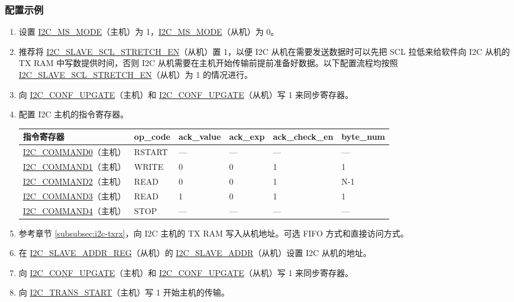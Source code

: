 \documentclass[main\_\_CN.tex]{subfiles}
\begin{document}
\subsubsection{配置示例}
\begin{enumerate}
\item 设置 \hyperref[fielddesc:I2CMSMODE]{I2C\_MS\_MODE}（主机）为 1，\hyperref[fielddesc:I2CMSMODE]{I2C\_MS\_MODE}（从机）为 0。
\item 推荐将 \hyperref[fielddesc:I2CSLAVESCLSTRETCHEN]{I2C\_SLAVE\_SCL\_STRETCH\_EN}（从机）置 1，以便 I2C 从机在需要发送数据时可以先把 SCL 拉低来给软件向 I2C 从机的 TX RAM 中写数提供时间，否则 I2C 从机需要在主机开始传输前提前准备好数据。以下配置流程均按照 \hyperref[fielddesc:I2CSLAVESCLSTRETCHEN]{I2C\_SLAVE\_SCL\_STRETCH\_EN}（从机）为 1 的情况进行。
\item 向 \hyperref[fielddesc:I2CCONFUPGATE]{I2C\_CONF\_UPGATE}（主机）和 \hyperref[fielddesc:I2CCONFUPGATE]{I2C\_CONF\_UPGATE}（从机）写 1 来同步寄存器。
\item 配置 I2C 主机的指令寄存器。
\clearpage
\begin{longtable}{ | p{4cm} | p{2cm} | p{2cm} | p{2cm} |p{2cm} | p{2cm} |}
\hline\rowcolor{lightgray}
指令寄存器& op\_code & ack\_value&ack\_exp&ack\_check\_en&byte\_num  \\ \hline
\hyperref[fielddesc:I2CCOMMAND0]{I2C\_COMMAND0}（主机）& RSTART& ---&---&---&---  \\ \hline
\hyperref[fielddesc:I2CCOMMAND1]{I2C\_COMMAND1}（主机）& WRITE& 0&0&1&1  \\ \hline
\hyperref[fielddesc:I2CCOMMAND2]{I2C\_COMMAND2}（主机）& READ& 0&0&1&N-1  \\ \hline
\hyperref[fielddesc:I2CCOMMAND3]{I2C\_COMMAND3}（主机）& READ& 1&0&1&1  \\ \hline
\hyperref[fielddesc:I2CCOMMAND4]{I2C\_COMMAND4}（主机）& STOP& ---&---&---&---  \\ \hline
\end{longtable}
\item 参考章节 \ref{subsubsec:i2c-txrx}，向 I2C 主机的 TX RAM 写入从机地址。可选 FIFO 方式和直接访问方式。
\item 在 \hyperref[regdesc:I2CSLAVEADDRREG]{I2C\_SLAVE\_ADDR\_REG}（从机）的 \hyperref[fielddesc:I2CSLAVEADDR]{I2C\_SLAVE\_ADDR}（从机）设置 I2C 从机的地址。
\item 向 \hyperref[fielddesc:I2CCONFUPGATE]{I2C\_CONF\_UPGATE}（主机）和 \hyperref[fielddesc:I2CCONFUPGATE]{I2C\_CONF\_UPGATE}（从机）写 1 来同步寄存器。
\item 向 \hyperref[fielddesc:I2CTRANSSTART]{I2C\_TRANS\_START}（主机）写 1 开始主机的传输。

\end{enumerate}
\end{document}
